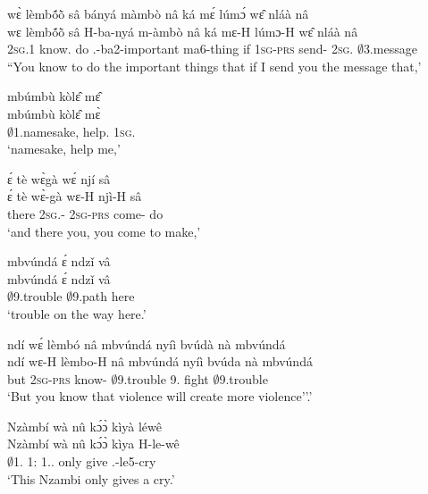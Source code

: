 \begin{exe}[(N234)] 
\exN\label{n228}
  \glll wɛ̀ lèmbṍõ̀ sâ bányá màmbò nâ ká mɛ́ lúmɔ́ wɛ̂ nláà nâ \\
       wɛ lèmbṍõ̀ sâ H-ba-nyá m-àmbò nâ ká mɛ-H lúmɔ-H wɛ̂ nláà nâ \\
        2\textsc{sg}.{\PST}1 know.{\COMPL}  do {\OBJ}.{\LINK}-ba2-important ma6-thing {\COMP} if 1\textsc{sg}-\textsc{prs} send-{\R} 2\textsc{sg}.{\OBJ} $\emptyset$3.message {\COMP} \\
    \trans ``You know to do the important things that if I send you the message that,'
 
\exN\label{n229}
  \glll mbúmbù kòlɛ̂ mɛ̂ \\
       mbúmbù kòlɛ̂ mɛ̀ \\
         $\emptyset$1.namesake, help.{\IMP}  1\textsc{sg}.{\OBJ} \\
    \trans `namesake, help me,'
 
\exN\label{n230}
  \glll ɛ́ tè wɛ̀gà wɛ́ njí sâ \\
        ɛ́ tè wɛ̀-gà wɛ-H njì-H sâ \\
        {\LOC} there 2\textsc{sg}.{\SBJ}-{\CONTR} 2\textsc{sg}-\textsc{prs} come-{\R} do  \\
    \trans `and there you, you come to make,'
 
\exN\label{n231}
  \glll mbvúndá ɛ́ ndzǐ vâ \\
       mbvúndá ɛ́ ndzǐ vâ \\
        $\emptyset$9.trouble {\LOC} $\emptyset$9.path here  \\
    \trans `trouble on the way here.'
 
\exN\label{n232} 
  \glll ndí wɛ́ lèmbó nâ mbvúndá nyíì bvúdà nà mbvúndá\\
        ndí wɛ-H lèmbo-H nâ mbvúndá nyíì bvúda nà mbvúndá\\
         but 2\textsc{sg}-\textsc{prs} know-{\R} {\COMP} $\emptyset$9.trouble 9.{\FUT} fight {\COM} $\emptyset$9.trouble\\
    \trans `But you know that violence will create more violence''.'
 
\exN\label{n233}
  \glll Nzàmbí wà nû kɔ́ɔ̀ kìyà léwê \\
         Nzàmbí wà nû kɔ́ɔ̀ kìya H-le-wê \\
        $\emptyset$1.{\PN} 1:{\ATT}  1.{\DEM}.{\PROX} only give {\OBJ}.{\LINK}-le5-cry  \\
    \trans `This Nzambi only gives a cry.'
 

\end{exe}
